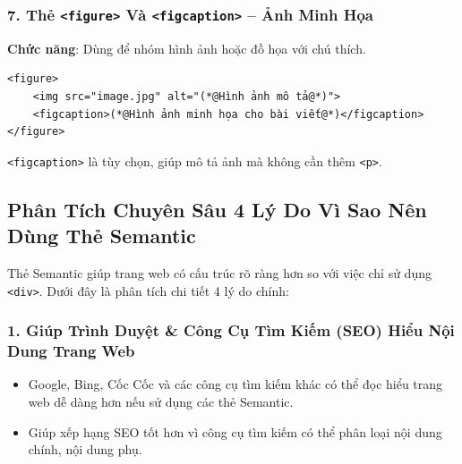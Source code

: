 \documentclass[11pt,oneside]{book}
\newcommand{\codeinline}[1]{\textcolor{accentOrange}{\texttt{#1}}}
\begin{document}
\subsubsection{7. Thẻ \codeinline{<figure>} Và \codeinline{<figcaption>} -- Ảnh Minh Họa}
\textbf{Chức năng}: Dùng để nhóm hình ảnh hoặc đồ họa với chú thích.


\begin{codeWindow}
\begin{lstlisting}[language=HTML5]
<figure>
    <img src="image.jpg" alt="(*@Hình ảnh mô tả@*)">
    <figcaption>(*@Hình ảnh minh họa cho bài viết@*)</figcaption>
</figure>
\end{lstlisting}
\end{codeWindow}

\begin{noteBox}
\codeinline{<figcaption>} là tùy chọn, giúp mô tả ảnh mà không cần thêm \codeinline{<p>}.
\end{noteBox}

\subsection{Phân Tích Chuyên Sâu 4 Lý Do Vì Sao Nên Dùng Thẻ Semantic}

Thẻ Semantic giúp trang web có cấu trúc rõ ràng hơn so với việc chỉ sử dụng \codeinline{<div>}. Dưới đây là phân tích chi tiết 4 lý do chính:

\subsubsection{1. Giúp Trình Duyệt \& Công Cụ Tìm Kiếm (SEO) Hiểu Nội Dung Trang Web}
\begin{itemize}[leftmargin=1.8em, itemsep=3pt, parsep=0pt]
    \item Google, Bing, Cốc Cốc và các công cụ tìm kiếm khác có thể đọc hiểu trang web dễ dàng hơn nếu sử dụng các thẻ Semantic.
    \item Giúp xếp hạng SEO tốt hơn vì công cụ tìm kiếm có thể phân loại nội dung chính, nội dung phụ.
\end{itemize}
\end{document}
